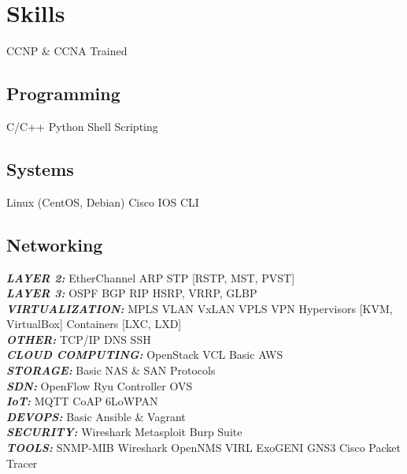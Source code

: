 \documentclass[print]{danis-resume}
\begin{document}
\begin{minipage}[t]{0.33\textwidth}

\section{Skills}
CCNP \& CCNA Trained \\
\sectionsep
\subsection{Programming}
C/C++ \textbullet{} Python \textbullet{} Shell Scripting \\
\sectionsep
\subsection{Systems}
Linux (CentOS, Debian) \textbullet{} Cisco IOS CLI \\
\sectionsep
\subsection{Networking}
{\footnotesize \textit{\textbf{LAYER 2: }}} 
EtherChannel \textbullet{} ARP \textbullet{} STP [RSTP, MST, PVST] \\
{\footnotesize \textit{\textbf{LAYER 3: }}} 
OSPF \textbullet{} BGP \textbullet{} RIP \textbullet{} HSRP, VRRP, GLBP \\
{\footnotesize \textit{\textbf{VIRTUALIZATION: }}} 
MPLS \textbullet{} VLAN \textbullet{} VxLAN \textbullet{} VPLS \textbullet{} VPN \textbullet{} Hypervisors [KVM, VirtualBox] \textbullet{} Containers  [LXC, LXD] \\
{\footnotesize \textit{\textbf{OTHER: }}} 
TCP/IP \textbullet{} DNS \textbullet{} SSH \\
{\footnotesize \textit{\textbf{CLOUD COMPUTING: }}} 
OpenStack \textbullet{} VCL \textbullet{} Basic AWS \\
{\footnotesize \textit{\textbf{STORAGE: }}} 
Basic NAS \& SAN Protocols \\
{\footnotesize \textit{\textbf{SDN: }}} 
OpenFlow \textbullet{} Ryu Controller \textbullet{} OVS \\
{\footnotesize \textit{\textbf{IoT: }}} 
MQTT \textbullet{} CoAP \textbullet{} 6LoWPAN \\
{\footnotesize \textit{\textbf{DEVOPS: }}} 
Basic Ansible \& Vagrant \\
{\footnotesize \textit{\textbf{SECURITY: }}} 
Wireshark \textbullet{} Metasploit \textbullet{} Burp Suite \\
{\footnotesize \textit{\textbf{TOOLS: }}} 
SNMP-MIB \textbullet{} Wireshark \textbullet{} OpenNMS \textbullet{} VIRL \textbullet{} ExoGENI \textbullet{} GNS3 \textbullet{} Cisco Packet Tracer \\


\end{minipage} 
\end{document}

